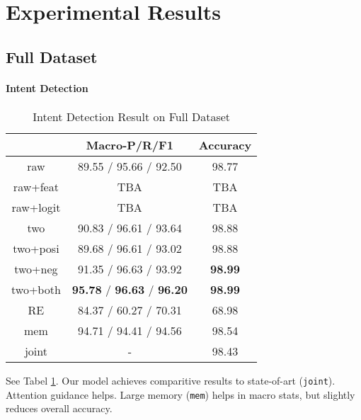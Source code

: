\section{Experimental Results}
\label{sec:experiments}
\subsection{Full Dataset}

\paragraph{Intent Detection}

\begin{table}
\setlength{\tabcolsep}{0.23em}
\centering
\small{
\begin{tabular}{|c|c|c|}

\hline
  & Macro-P/R/F1 & Accuracy  \\
\hline
raw & 89.55 / 95.66 / 92.50 & 98.77  \\
\hline
raw+feat & TBA &TBA  \\
\hline
raw+logit & TBA & TBA  \\
\hline
two & 90.83 / 96.61 / 93.64 & 98.88 \\
\hline
two+posi & 89.68 / 96.61 / 93.02 & 98.88 \\
\hline
two+neg & 91.35 / 96.63 / 93.92 & \textbf{98.99} \\
\hline
two+both & \textbf{95.78} / \textbf{96.63} / \textbf{96.20} & \textbf{98.99} \\
\hline
\hline
RE & 84.37 / 60.27 / 70.31 & 68.98 \\
\hline
mem & 94.71 / 94.41 / 94.56 & 98.54 \\
\hline
joint & - & 98.43 \\
\hline 

\end{tabular}
}
\caption{Intent Detection Result on Full Dataset}
\label{tab_intent_full}
\end{table}

See Tabel \ref{tab_intent_full}.
Our model achieves comparitive results to state-of-art (\texttt{joint}). Attention guidance helps. Large memory (\texttt{mem}) helps in macro stats, but slightly reduces overall accuracy.


